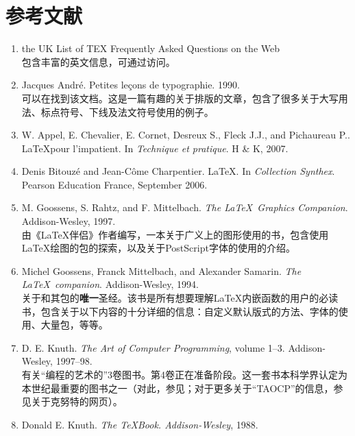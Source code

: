 \chapter*{参考文献}

\begin{enumerate}
    \renewcommand{\labelenumi}{[\theenumi]}
    \item the UK List of TEX Frequently Asked Questions on the Web\\
    包含丰富的英文信息，可通过访问。
    \item Jacques André. Petites leçons de typographie. 1990.\\
    可以在找到该文档。这是一篇有趣的关于排版的文章，包含了很多关于大写用法、标点符号、下线及法文符号使用的例子。
    \item W. Appel, E. Chevalier, E. Cornet, Desreux S., Fleck J.J., and Pichaureau P.. \LaTeX pour l'impatient. In \emph{Technique et pratique}. H \& K, 2007.
    \item Denis Bitouzé and Jean-Côme Charpentier. \LaTeX . In \emph{Collection Synthex}. Pearson Education France, September 2006.
    \item M. Goossens, S. Rahtz, and F. Mittelbach. \emph{The \LaTeX \ Graphics Companion}. Addison-Wesley, 1997.\\
    由《\LaTeX 伴侣》作者编写，一本关于广义上的图形使用的书，包含使用\LaTeX 绘图的包的探索，以及关于PostScript字体的使用的介绍。
    \item Michel Goossens, Franck Mittelbach, and Alexander Samarin. \emph{The \LaTeX \ companion}. \linebreak Addison-Wesley, 1994.\\
    关于\LaTeXe 和其包的\textbf{唯一}圣经。该书是所有想要理解\LaTeX 内嵌函数的用户的必读书，包含关于以下内容的十分详细的信息：自定义默认版式的方法、字体的使用、大量包，等等。
    \item D. E. Knuth. \emph{The Art of Computer Programming}, volume 1–3. Addison-Wesley, 1997–98.\\
    有关“编程的艺术的”3卷图书。第4卷正在准备阶段。这一套书本科学界认定为本世纪最重要的图书之一（对此，参见；对于更多关于“TAOCP”的信息，参见关于克努特的网页）。
    \item Donald E. Knuth. \emph{The \TeX Book. Addison-Wesley}, 1988.\\

\end{enumerate}
